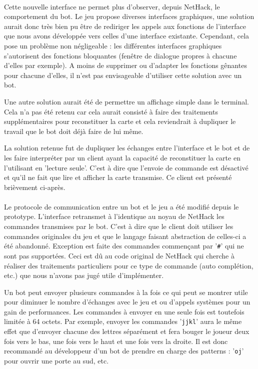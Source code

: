 \documentclass[a4paper,12pt]{article}
\begin{document}
\paragraph{} Cette nouvelle interface ne permet plus d'observer, depuis
NetHack, le comportement du bot. Le jeu propose diverses interfaces
graphiques, une solution aurait donc très bien pu être de rediriger les appels
aux fonctions de l'interface que nous avons développée vers celles d'une
interface existante. Cependant, cela pose un problème non négligeable : les
différentes interfaces graphiques s'autorisent des fonctions bloquantes
(fenêtre de dialogue propres à chacune d'elles par exemple). A moins de
supprimer ou d'adapter les fonctions gênantes pour chacune d'elles, il n'est
pas envisageable d'utiliser cette solution avec un bot.

Une autre solution aurait été de permettre un affichage simple dans le
terminal. Cela n'a pas été retenu car cela aurait consisté à faire des
traitements supplémentaires pour reconstituer la carte et cela reviendrait à
dupliquer le travail que le bot doit déjà faire de lui même.

La solution retenue fut de dupliquer les échanges entre l'interface et le bot
et de les faire interpréter par un client ayant la capacité de reconstituer la
carte en l'utilisant en 'lecture seule'. C'est à dire que l'envoie de
commande est désactivé et qu'il ne fait que lire et afficher la carte
transmise. Ce client est présenté brièvement ci-après.


\paragraph{} Le protocole de communication entre un bot et le jeu a été
modifié depuis le prototype. L'interface retransmet à l'identique au noyau de
NetHack les commandes transmises par le bot. C'est à dire que le client doit
utiliser les commandes originales du jeu et que le langage faisant abstraction
de celles-ci a été abandonné. Exception est faite des commandes commençant par
'\verb!#!' qui ne sont pas supportées. Ceci est dû au code original de NetHack
qui cherche à réaliser des traitements particuliers pour ce type de commande
(auto complétion, etc.) que nous n'avons pas jugé utile d'implémenter.

Un bot peut envoyer plusieurs commandes à la fois ce qui peut se montrer utile
pour diminuer le nombre d'échanges avec le jeu et ou d'appels systèmes pour un
gain de performances. Les commandes à envoyer en une seule fois est toutefois
limitée à 64 octets. Par exemple, envoyer les commandes '\verb!jjkl!' aura le
même effet que d'envoyer chacune des lettres séparément et fera bouger le
joueur deux fois vers le bas, une fois vers le haut et une fois vers la
droite. Il est donc recommandé au développeur d'un bot de prendre en charge
des patterns : '\verb!oj!' pour ouvrir une porte au sud, etc.
\end{document}
